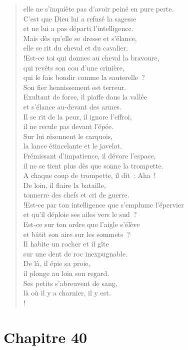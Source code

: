 \documentclass[french,twoside]{book} %
\newcommand\chapteropen{} %
\newcommand\chapterclose{} %
\begin{document}
\begin{verse}
elle ne s’inquiète pas d’avoir peiné en pure perte.\\
C’est que Dieu lui a refusé la sagesse \\
et ne lui a pas départi l’intelligence.\\
Mais dès qu’elle se dresse et s’élance, \\
elle se rit du cheval et du cavalier.\\!Est-ce toi qui donnes au cheval la bravoure, \\
qui revêts son cou d’une crinière,\\
qui le fais bondir comme la sauterelle ? \\
Son fier hennissement est terreur.\\
Exultant de force, il piaffe dans la vallée \\
et s’élance au-devant des armes.\\
Il se rit de la peur, il ignore l’effroi, \\
il ne recule pas devant l’épée.\\
Sur lui résonnent le carquois, \\
la lance étincelante et le javelot.\\
Frémissant d’impatience, il dévore l’espace, \\
il ne se tient plus dès que sonne la trompette.\\
A chaque coup de trompette, il dit : Aha ! \\
De loin, il flaire la bataille, \\
tonnerre des chefs et cri de guerre.\\!Est-ce par ton intelligence que s’emplume l’épervier \\
et qu’il déploie ses ailes vers le sud ?\\
Est-ce sur ton ordre que l’aigle s’élève \\
et bâtit son aire sur les sommets ?\\
Il habite un rocher et il gîte \\
sur une dent de roc inexpugnable.\\
De là, il épie sa proie, \\
il plonge au loin son regard.\\
Ses petits s’abreuvent de sang, \\
là où il y a charnier, il y est.\\!
\end{verse}
\chapterclose


\chapteropen
\chapter[Chapitre 40]{Chapitre 40}\renewcommand{\leftmark}{Chapitre 40}
\end{document}
